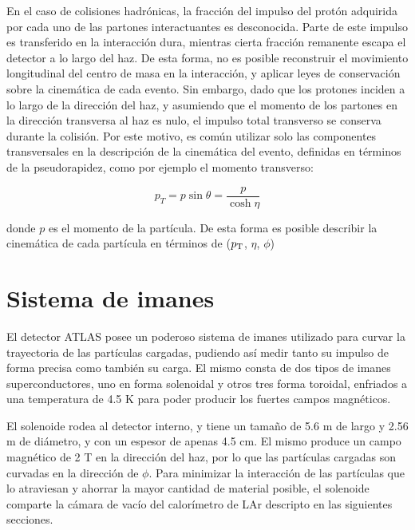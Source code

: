 
En el caso de colisiones hadrónicas, la fracción del impulso del protón adquirida por cada uno de las partones interactuantes es desconocida. Parte de este impulso es transferido en la interacción dura, mientras cierta fracción remanente escapa el detector a lo largo del haz. De esta forma, no es posible reconstruir el movimiento longitudinal del centro de masa en la interacción, y aplicar leyes de conservación sobre la cinemática de cada evento. Sin embargo, dado que los protones inciden a lo largo de la dirección del haz, y asumiendo que el momento de los partones en la dirección transversa al haz es nulo, el impulso total transverso se conserva durante la colisión. Por este motivo, es común utilizar solo las componentes transversales en la descripción de la cinemática del evento, definidas en términos de la pseudorapidez, como por ejemplo el momento transverso:

\begin{equation}
p_{T}=p\sin\theta=\frac{p}{\cosh{\eta}}
\end{equation}

\noindent
donde $p$ es el momento de la partícula. De esta forma es posible describir la cinemática de cada partícula en términos de ($p_{\text{T}}$, $\eta$, $\phi$)

\section{Sistema de imanes}

El detector ATLAS posee un poderoso sistema de imanes \cite{magnet} utilizado para curvar la trayectoria de las partículas cargadas, pudiendo así medir tanto su impulso de forma precisa como también su carga. El mismo consta de dos tipos de imanes superconductores, uno en forma solenoidal y otros tres forma toroidal, enfriados a una temperatura de 4.5 K para poder producir los fuertes campos magnéticos.

El solenoide rodea al detector interno, y tiene un tamaño de 5.6 m de largo y 2.56 m de diámetro, 
y con un espesor de apenas 4.5 cm. El mismo produce un campo magnético de 2 T en la dirección del haz, por lo que las partículas cargadas son curvadas en la dirección de $\phi$. Para minimizar la interacción de las partículas que lo atraviesan y ahorrar la mayor cantidad de material posible, el solenoide comparte la cámara de vacío del calorímetro de LAr descripto en las siguientes secciones.

